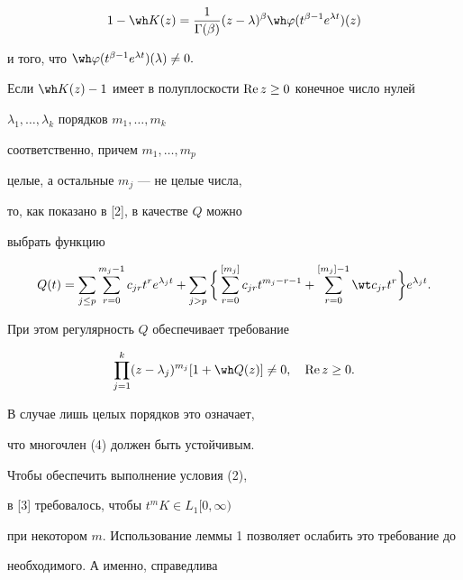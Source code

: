 $$


1-\wh K(z)=\frac{1}{\Gamma (\beta)}(z-\lambda)^{\beta}


\wh\varphi (t^{\beta -1}e^{\lambda t})(z)


$$


и того, что $\wh\varphi (t^{\beta -1}e^{\lambda t})(\lambda)\neq 0.$





Если $\wh K(z)-1$ имеет в полуплоскости $\operatorname{Re} z\geq 0$ конечное число нулей


$\lambda_1,\dotsc,\lambda_k$ порядков $m_1,\dotsc,m_k$


соответственно, причем $m_1,\dotsc,m_p$


целые, а остальные $m_j$ --- не целые числа,


то, как показано в [2], в качестве $Q$ можно


выбрать функцию


$$


Q(t)=\sum_{j\leq p}\sum\limits_{r=0}^{m_j-1}


c_{j r}t^re^{\lambda_j t}+\sum\limits_{j>p}


\bigg\{\sum_{r=0}^{[m_j]}c_{j r}t^{m_j-r-1}+


\sum_{r=0}^{[m_j]-1}\wt c_{j r}t^r\bigg\}e^{\lambda_j t}.


$$


При этом регулярность $Q$ обеспечивает требование


\begin{equation}


\prod\limits_{j=1}^k (z-\lambda_j)^{m_j}[1+\wh Q(z)]\neq 0,


\quad \re z\geq 0.


\end{equation}





В случае лишь целых порядков это означает,


что многочлен (4) должен быть устойчивым.





Чтобы обеспечить выполнение условия (2),


в [3] требовалось, чтобы $t^mK\in L_1[0,\infty)$


при некотором $m$. Использование леммы 1 позволяет ослабить это требование до


необходимого. А именно, справедлива





